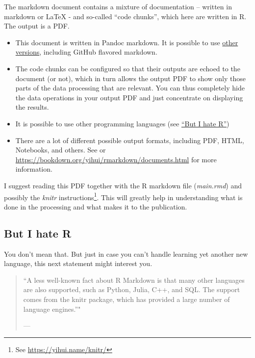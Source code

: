 \documentclass[10pt,]{article}
\providecommand{\tightlist}{%
  \setlength{\itemsep}{0pt}\setlength{\parskip}{0pt}}
\let\rmarkdownfootnote\footnote%
\def\footnote{\protect\rmarkdownfootnote}
\begin{document}
The markdown document contains a mixture of documentation -- written in markdown or LaTeX - and so-called ``code chunks'', which here are written in R. The output is a PDF.

\begin{itemize}
\tightlist
\item
  This document is written in Pandoc markdown. It is possible to use \href{https://bookdown.org/yihui/rmarkdown/markdown-document.html\#markdown-variants}{other versions}, including GitHub flavored markdown.
\item
  The code chunks can be configured so that their outputs are echoed to the document (or not), which in turn allows the output PDF to show only those parts of the data processing that are relevant. You can thus completely hide the data operations in your output PDF and just concentrate on displaying the results.
\item
  It is possible to use other programming languages (see \protect\hyperlink{pleaseNotR}{``But I hate R''})
\item
  There are a lot of different possible output formats, including PDF, HTML, Notebooks, and others. See \citep{R-Markdown-Guide} or \url{https://bookdown.org/yihui/rmarkdown/documents.html} for more information.
\end{itemize}

I suggest reading this PDF together with the R markdown file (\emph{main.rmd}) and possibly the \emph{knitr} instructions\footnote{See \url{https://yihui.name/knitr/}}. This will greatly help in understanding what is done in the processing and what makes it to the publication.

\hypertarget{pleaseNotR}{%
\subsection{But I hate R}\label{pleaseNotR}}

You don't mean that. But just in case you can't handle learning yet another new language, this next statement might interest you.

\begin{quote}
``A less well-known fact about R Markdown is that many other languages are also supported, such as Python, Julia, C++, and SQL. The support comes from the knitr package, which has provided a large number of language engines.''"

--- \citet{R-Markdown-Guide}
\end{quote}
\end{document}

